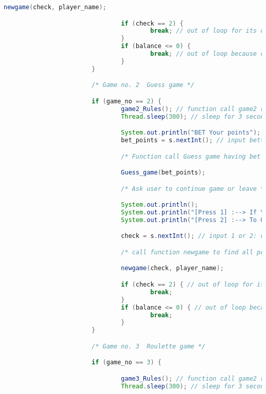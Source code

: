 \documentclass[]{article}
\begin{document}
\begin{lstlisting}[language=Java]
                                newgame(check, player_name);

                                if (check == 2) {
                                        break; // out of loop for its own choice
                                }
                                if (balance <= 0) {
                                        break; // out of loop because of 0 balance
                                }
                        }

                        /* Game no. 2  Guess game */

                        if (game_no == 2) {
                                game2_Rules(); // function call game2 rules
                                Thread.sleep(300); // sleep for 3 seconds

                                System.out.println("BET Your points");
                                bet_points = s.nextInt(); // input betted points

                                /* Function call Guess game having bet points as parameters */

                                Guess_game(bet_points);

                                /* Ask user to continue game or leave */

                                System.out.println();
                                System.out.println("[Press 1] :--> If You Like To Try Another game");
                                System.out.println("[Press 2] :--> To QUIT");

                                check = s.nextInt(); // input 1 or 2: continue or leave

                                /* call function newgame to find all possibilities */

                                newgame(check, player_name);

                                if (check == 2) { // out of loop for its own choice
                                        break;
                                }
                                if (balance <= 0) { // out of loop because of 0 balance
                                        break;
                                }
                        }

                        /* Game no. 3  Roulette game */

                        if (game_no == 3) {

                                game3_Rules(); // function call game2 rules
                                Thread.sleep(300); // sleep for 3 seconds


\end{lstlisting}
\end{document}

